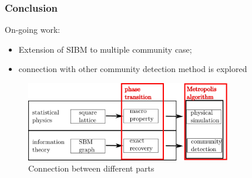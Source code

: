 \documentclass[notheorems]{beamer}
\begin{document}
	
	
	\begin{frame}
	\frametitle{Conclusion}
	On-going work:
	\begin{itemize}
	\item Extension of SIBM to multiple community case;
	\item connection with other community detection method is explored
	\end{itemize}
	\begin{figure}
		\includegraphics[width=0.8\textwidth]{overview.pdf}
		\caption{Connection between different parts}
	\end{figure}
	\end{frame}
\end{document}
